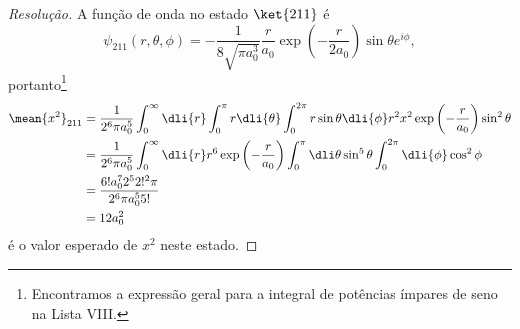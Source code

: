\begin{proof}[Resolução]
    A função de onda no estado \(\ket{211}\) é
    \begin{equation*}
        \psi_{211}(r, \theta,\phi) = -\frac{1}{8\sqrt{\pi a_0^3}} \frac{r}{a_0}\exp\left(-\frac{r}{2a_0} \right)\sin\theta e^{i\phi},
    \end{equation*}
    portanto\footnote{Encontramos a expressão geral para a integral de potências ímpares de seno na Lista VIII.}
    \begin{align*}
        \mean{x^2}_{211} &= \frac{1}{2^6\pi a_0^5} \int_0^\infty \dli{r} \int_0^\pi r \dli{\theta} \int_0^{2\pi} r\sin\theta \dli{\phi} r^2 x^2 \exp\left(-\frac{r}{a_0}\right) \sin^2 \theta\\
                         &= \frac{1}{2^6\pi a_0^5} \int_0^\infty \dli{r} r^6 \exp\left(-\frac{r}{a_0}\right) \int_0^{\pi} \dli\theta \sin^5\theta \int_0^{2\pi}\dli{\phi} \cos^2\phi\\
                         &= \frac{6! a_0^7 2^5 2!^2 \pi}{2^6 \pi a_0^5 5!}\\
                         &= 12a_0^2
    \end{align*}
    é o valor esperado de \(x^2\) neste estado.
\end{proof}
